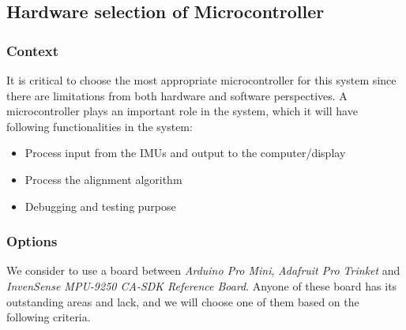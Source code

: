 


\subsection{Hardware selection of Microcontroller}
\subsubsection{Context}
It is critical to choose the most appropriate microcontroller for this system since there are limitations from both hardware and software perspectives. A microcontroller plays an important role in the system, which it will have following functionalities in the system:

\begin{itemize}
	\item Process input from the IMUs and output to the computer/display
	\item Process the alignment algorithm
	\item Debugging and testing purpose\\
\end{itemize}

\subsubsection{Options}
We consider to use a board between \textit{Arduino Pro Mini}\cite{arduino}, \textit{Adafruit Pro Trinket}\cite{trinket} and \textit{InvenSense MPU-9250 CA-SDK Reference Board}\cite{MPU9250SDK}. Anyone of these board has its outstanding areas and lack, and we will choose one of them based on the following criteria.\\

